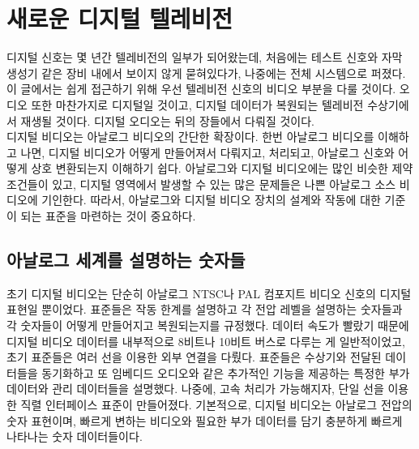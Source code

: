 \chapter{새로운 디지털 텔레비전}
디지털 신호는 몇 년간 텔레비전의 일부가 되어왔는데, 처음에는 테스트 신호와 자막 생성기 같은 장비 내에서 보이지 않게 묻혀있다가, 나중에는 전체 시스템으로 퍼졌다.
이 글에서는 쉽게 접근하기 위해 우선 텔레비전 신호의 비디오 부분을 다룰 것이다.
오디오 또한 마찬가지로 디지털일 것이고, 디지털 데이터가 복원되는 텔레비전 수상기에서 재생될 것이다. 디지털 오디오는 뒤의 장들에서 다뤄질 것이다.
\\
디지털 비디오는 아날로그 비디오의 간단한 확장이다. 한번 아날로그 비디오를 이해하고 나면, 디지털 비디오가 어떻게 만들어져서 다뤄지고, 처리되고, 아날로그 신호와 어떻게 상호 변환되는지 이해하기 쉽다.
아날로그와 디지털 비디오에는 많인 비슷한 제약 조건들이 있고, 디지털 영역에서 발생할 수 있는 많은 문제들은 나쁜 아날로그 소스 비디오에 기인한다.
따라서, 아날로그와 디지털 비디오 장치의 설계와 작동에 대한 기준이 되는 표준을 마련하는 것이 중요하다.

\section{아날로그 세계를 설명하는 숫자들}
초기 디지털 비디오는 단순히 아날로그 NTSC나 PAL 컴포지트 비디오 신호의 디지털 표현일 뿐이었다.
표준들은 작동 한계를 설명하고 각 전압 레벨을 설명하는 숫자들과 각 숫자들이 어떻게 만들어지고 복원되는지를 규정했다.
데이터 속도가 빨랐기 때문에 디지털 비디오 데이터를 내부적으로 8비트나 10비트 버스로 다루는 게 일반적이었고, 초기 표준들은 여러 선을 이용한 외부 연결을 다뤘다.
표준들은 수상기와 전달된 데이터들을 동기화하고 또 임베디드 오디오와 같은 추가적인 기능을 제공하는 특정한 부가 데이터와 관리 데이터들을 설명했다.
나중에, 고속 처리가 가능해지자, 단일 선을 이용한 직렬 인터페이스 표준이 만들어졌다.
기본적으로, 디지털 비디오는 아날로그 전압의 숫자 표현이며, 빠르게 변하는 비디오와 필요한 부가 데이터를 담기 충분하게 빠르게 나타나는 숫자 데이터들이다.

